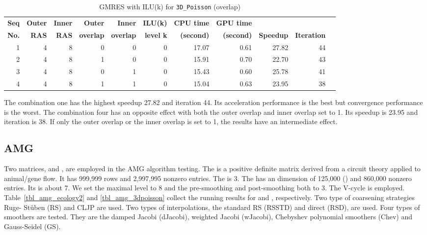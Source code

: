 \documentclass[runningheads,a4paper]{llncs}
\begin{document}
{\begin{table}[!htb]
\centering
\caption{GMRES with ILU(k) for \texttt{3D\_Poisson} (overlap)}
\begin{tabular}{|r|r|r|r|r|r|r|r|r|r|r|} \hline
\bfseries Seq & \bfseries Outer & \bfseries Inner & \bfseries Outer & \bfseries Inner & \bfseries ILU(k) & \bfseries CPU time  & \bfseries GPU time  & \bfseries        & \bfseries  \\
\bfseries No. & \bfseries RAS   & \bfseries RAS & \bfseries overlap & \bfseries overlap & \bfseries level k & \bfseries (second)	& \bfseries (second)  & \bfseries Speedup  & \bfseries Iteration\\ \hline
1	&4	&8	&0	&0	&0	&17.07	&0.61	&27.82	&44\\ \hline
2	&4	&8	&1	&0	&0	&15.91	&0.70	&22.70	&43\\ \hline
3	&4	&8	&0	&1	&0	&15.43	&0.60	&25.78	&41\\ \hline
4	&4	&8	&1	&1	&0	&15.04	&0.63	&23.95	&38\\ \hline
\end{tabular}
\label{tbl_overlap}
\end{table}

The combination one has the highest speedup 27.82 and iteration 44. Its acceleration performance is the best but convergence performance is the worst. The combination four has an opposite effect with both the outer overlap and inner overlap set to 1. Its speedup is 23.95 and iteration is 38. If only the outer overlap or the inner overlap is set to 1, the results have an intermediate effect.

\subsection{AMG}

Two matrices,  and , are employed in the AMG algorithm testing. The  is a positive definite matrix derived from a circuit theory applied to animal/gene flow. It has 999,999 rows and 2,997,995 nonzero entries. The  is 3. The  has an dimension of 125,000 () and 860,000 nonzero entries. Its  is about 7. We set the maximal level to 8 and the pre-smoothing and post-smoothing both to 3. The V-cycle is employed. Table~\ref{tbl_amg_ecology2} and \ref{tbl_amg_3dpoisson} collect the running results for  and , respectively. Two type of coarsening strategies Ruge- St\"{u}ben (RS) and CLJP are used. Two types of interpolations, the standard RS (RSSTD) and direct (RSD), are used. Four types of smoothers are tested. They are the damped Jacobi (dJacobi), weighted Jacobi (wJacobi), Chebyshev polynomial smoothers (Chev) and Gauss-Seidel (GS).

}
\end{document}
